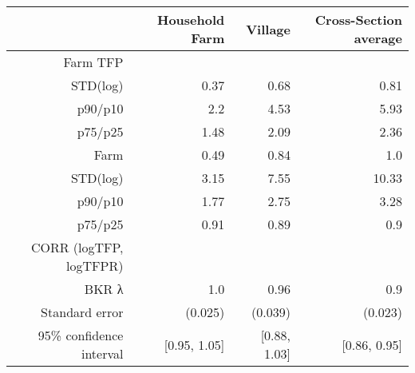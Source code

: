 \begin{tabular}{rrrr}
  \hline
   & \textbf{Household Farm} & \textbf{Village} & \textbf{Cross-Section average} \\\hline
  Farm TFP &  &  &  \\
  STD(log) & 0.37 & 0.68 & 0.81 \\
  p90/p10 & 2.2 & 4.53 & 5.93 \\
  p75/p25 & 1.48 & 2.09 & 2.36 \\
  Farm & 0.49 & 0.84 & 1.0 \\
  STD(log) & 3.15 & 7.55 & 10.33 \\
  p90/p10 & 1.77 & 2.75 & 3.28 \\
  p75/p25 & 0.91 & 0.89 & 0.9 \\
  CORR (logTFP, logTFPR) &  &  &  \\
  BKR λ & 1.0 & 0.96 & 0.9 \\
  Standard error & (0.025) & (0.039) & (0.023) \\
  95\% confidence interval & [0.95, 1.05] & [0.88, 1.03] & [0.86, 0.95] \\\hline
\end{tabular}